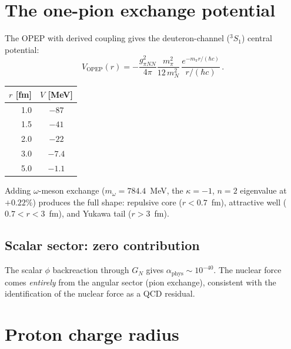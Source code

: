 \documentclass[11pt,letterpaper]{article}
\numberwithin{equation}{section}
\begin{document}
\section{The one-pion exchange potential}
\label{sec:opep}

The OPEP with derived coupling gives the deuteron-channel (${}^3S_1$)
central potential:
\begin{equation}
  V_\mathrm{OPEP}(r) = -\frac{g^2_{\pi NN}}{4\pi}
  \frac{m_\pi^2}{12\,m_N^2}\,\frac{e^{-m_\pi r/(\hbar c)}}{r/(\hbar c)}\,.
\end{equation}

\begin{center}
\begin{tabular}{rc}
\toprule
$r$ [fm] & $V$ [MeV] \\
\midrule
1.0 & $-87$ \\
1.5 & $-41$ \\
2.0 & $-22$ \\
3.0 & $-7.4$ \\
5.0 & $-1.1$ \\
\bottomrule
\end{tabular}
\end{center}

Adding $\omega$-meson exchange ($m_\omega = 784.4$~MeV, the
$\kappa = -1$, $n = 2$ eigenvalue at $+0.22\%$) produces the full
shape: repulsive core ($r < 0.7$~fm), attractive well
($0.7 < r < 3$~fm), and Yukawa tail ($r > 3$~fm).

\subsection{Scalar sector: zero contribution}

The scalar $\phi$ backreaction through $G_N$ gives
$\alpha_\mathrm{phys} \sim 10^{-40}$.  The nuclear force comes
\emph{entirely} from the angular sector (pion exchange), consistent
with the identification of the nuclear force as a QCD residual.

\section{Proton charge radius}
\label{sec:rp}
\end{document}
